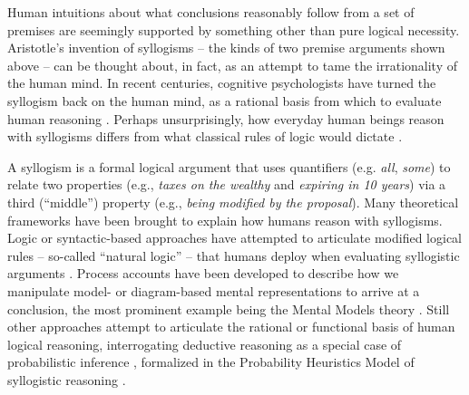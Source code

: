 \documentclass[floatsintext, doc]{apa6}
\begin{document}
Human intuitions about what conclusions reasonably follow from a set of premises are seemingly supported by something other than pure logical necessity. %
Aristotle's invention of syllogisms -- the kinds of two premise arguments shown above --  can be thought about, in fact, as an attempt to tame the irrationality of the human mind.
In recent centuries, cognitive psychologists have turned the syllogism back on the human mind, as a rational basis from which to evaluate human reasoning \cite{Storring1908}.
Perhaps unsurprisingly, how everyday human beings reason with syllogisms differs from what classical rules of logic would dictate \cite<for a meta-analysis, see:>{Khemlani2012}.




A syllogism is a formal logical argument that uses quantifiers (e.g. \emph{all}, \emph{some}) to relate two properties (e.g., \emph{taxes on the wealthy} and \emph{expiring in 10 years}) via a third (``middle'') property (e.g., \emph{being modified by the proposal}). 
Many theoretical frameworks have been brought to explain how humans reason with syllogisms.
Logic or syntactic-based approaches have attempted to articulate modified logical rules -- so-called ``natural logic'' -- that humans deploy when evaluating syllogistic arguments \cite{braine1983logical, rips1994, geurts2003reasoning}.
Process accounts have been developed to describe how we manipulate  model- or diagram-based mental representations to arrive at a conclusion, the most prominent example being the Mental Models theory \cite{johnson1975models}.
Still other approaches attempt to articulate the rational or functional basis of human logical reasoning, interrogating deductive reasoning as a special case of probabilistic inference \cite{oaksford2001probabilistic, oaksford2007bayesian, hahn2007rationality, tenenbaum2006theory},  formalized in the Probability Heuristics Model of syllogistic reasoning \cite{Chater1999}.
\end{document}
